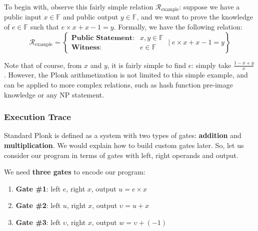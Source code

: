 \documentclass[../../book.tex]{subfiles}
\begin{document}
\begin{example}
To begin with, observe this fairly simple relation
$\mathcal{R}_{\text{example}}$: suppose we have a public input $x \in
\mathbb{F}$ and public output $y \in \mathbb{F}$, and we want to prove the knowledge of $e \in
\mathbb{F}$ such that $e \times x + x - 1 = y$. Formally, we have the following relation:
\begin{equation*}
    \mathcal{R}_{\text{example}} = \left\{ \begin{matrix}
        \textbf{Public Statement:} & x, y \in \mathbb{F} \\
        \textbf{Witness}: & e \in \mathbb{F}
    \end{matrix} \; \Big| \; e \times x + x - 1 = y \right\}
\end{equation*}

\end{example}

\begin{remark}
    Note that of course, from $x$ and $y$, it is fairly simple to find $e$: simply take $\frac{1 - x + y}{x}$. However, the Plonk arithmetization 
    is not limited to this simple example, and can be applied to more complex relations, such as hash function pre-image knowledge or any NP statement.
\end{remark}

\subsubsection{Execution Trace}

Standard Plonk is defined as a system with two types of gates: \textbf{addition}
and \textbf{multiplication}. We would explain how to build custom gates later.
So, let us consider our program in terms of gates with left, right operands and
output. 

\begin{example}
    We need \textbf{three gates} to encode our program:
    \begin{enumerate}
        \item \textbf{Gate \#1}: left $e$, right $x$, output \(u = e \times x\)
        \item \textbf{Gate \#2}: left $u$, right $x$, output \(\upsilon = u + x\)
        \item \textbf{Gate \#3}: left $\upsilon$, right $x$, output \(w = \upsilon + (-1)\)
    \end{enumerate}
\end{example}
\end{document}

